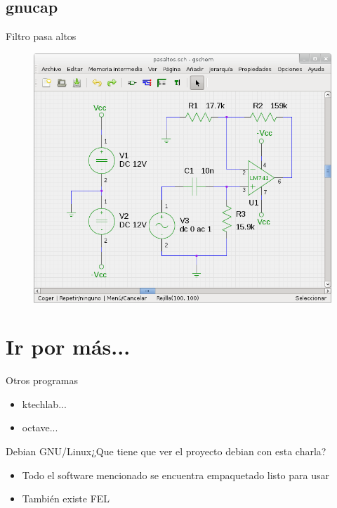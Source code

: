 \documentclass{beamer}
\begin{document}
\subsection[gnucap - \url{http://www.gnucap.org}]{gnucap}
\begin{frame}{Filtro pasa altos}
  \begin{figure}
    \centering
    \includegraphics[scale=0.4]{geda/img/gschem/gschem-pasaltos.png}
  \end{figure}
\end{frame}

\section{Ir por más...}

\begin{frame}{Otros programas}
  \begin{itemize}
  \item ktechlab... %
  \item octave...
  \end{itemize}
\end{frame}

\begin{frame}{Debian GNU/Linux}{¿Que tiene que ver el proyecto debian con esta charla?}
  \begin{itemize}
  \item Todo el software mencionado se encuentra empaquetado listo para usar
  \item También existe FEL
  \end{itemize}
\end{frame}
\end{document}
